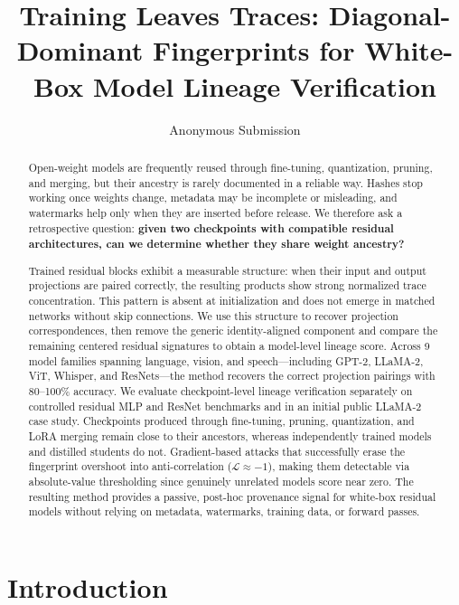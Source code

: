 \documentclass[letterpaper]{article}
\title{Training Leaves Traces: Diagonal-Dominant Fingerprints for White-Box Model Lineage Verification}
\author{Anonymous Submission}
\begin{document}
\maketitle

\begin{abstract}
Open-weight models are frequently reused through fine-tuning, quantization, pruning, and merging, but their ancestry is rarely documented in a reliable way. Hashes stop working once weights change, metadata may be incomplete or misleading, and watermarks help only when they are inserted before release. We therefore ask a retrospective question: \textbf{given two checkpoints with compatible residual architectures, can we determine whether they share weight ancestry?}

Trained residual blocks exhibit a measurable structure: when their input and output projections are paired correctly, the resulting products show strong normalized trace concentration. This pattern is absent at initialization and does not emerge in matched networks without skip connections. We use this structure to recover projection correspondences, then remove the generic identity-aligned component and compare the remaining centered residual signatures to obtain a model-level lineage score. Across 9 model families spanning language, vision, and speech---including GPT-2, LLaMA-2, ViT, Whisper, and ResNets---the method recovers the correct projection pairings with 80--100\% accuracy. We evaluate checkpoint-level lineage verification separately on controlled residual MLP and ResNet benchmarks and in an initial public LLaMA-2 case study. Checkpoints produced through fine-tuning, pruning, quantization, and LoRA merging remain close to their ancestors, whereas independently trained models and distilled students do not. Gradient-based attacks that successfully erase the fingerprint overshoot into anti-correlation ($\mathcal{L} \approx -1$), making them detectable via absolute-value thresholding since genuinely unrelated models score near zero. The resulting method provides a passive, post-hoc provenance signal for white-box residual models without relying on metadata, watermarks, training data, or forward passes.
\end{abstract}

\section{Introduction}
\end{document}
